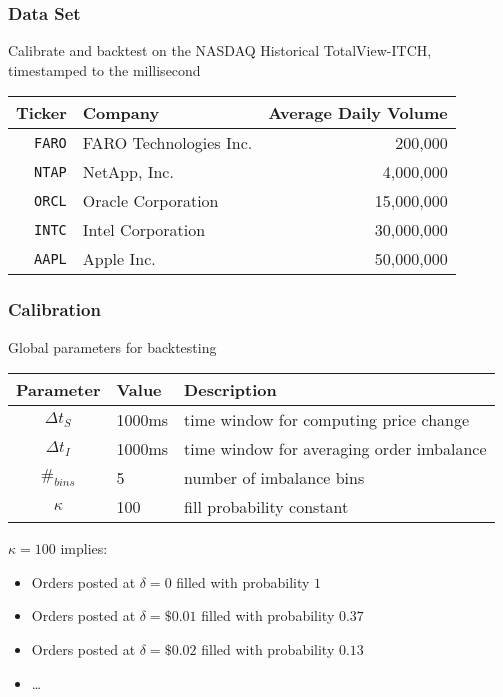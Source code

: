 \begin{frame}
\frametitle{Data Set}
Calibrate and backtest on the NASDAQ Historical TotalView-ITCH, timestamped to the millisecond

\begin{table}[H]%
\centering%
%
\begin{tabular}{@{} rlr @{}}%
\toprule
Ticker & Company & Average Daily Volume \\
\midrule
\texttt{FARO} & FARO Technologies Inc. & 200,000 \\
\texttt{NTAP} & NetApp, Inc. & 4,000,000 \\
\texttt{ORCL} & Oracle Corporation & 15,000,000 \\
\texttt{INTC} & Intel Corporation & 30,000,000 \\
\texttt{AAPL} & Apple Inc. & 50,000,000 \\
\bottomrule
\end{tabular}%
\end{table}%
\end{frame}

\begin{frame}
\frametitle{Calibration}
Global parameters for backtesting
\begin{table}
\centering%
%
\begin{adjustbox}{width=\textwidth}
\begin{tabular}{cll}
\toprule
Parameter & Value & Description \\
\midrule
$\Delta t_S$ & 1000ms & time window for computing price change \\
$\Delta t_I$ & 1000ms & time window for averaging order imbalance \\
$\#_{bins}$ & 5 & number of imbalance bins \\
$\kappa$ & 100 & fill probability constant \\
\bottomrule
\end{tabular}
\end{adjustbox}
\end{table}
$\kappa = 100$ implies:
\begin{itemize}
\item Orders posted at $\delta=0$ filled with probability $1$
\item Orders posted at $\delta=\$0.01$ filled with probability $0.37$
\item Orders posted at $\delta=\$0.02$ filled with probability $0.13$
\item \dots
\end{itemize}
\end{frame}

